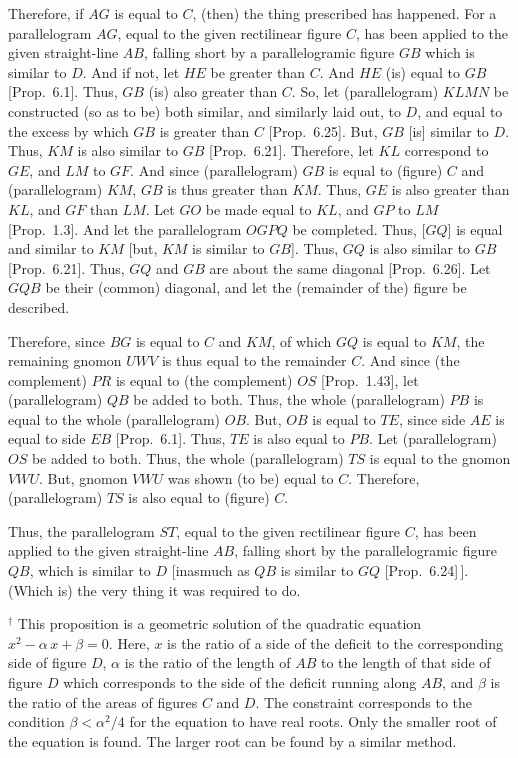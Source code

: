 \begin{Parallel}{}{}
{Therefore, if $AG$ is equal to $C$, (then) the thing prescribed has happened. For
a parallelogram  $AG$, equal to the given rectilinear figure $C$, has been
applied to the given straight-line $AB$, falling short by a parallelogramic
figure $GB$ which is similar to $D$. And if not,  let $HE$ be greater than $C$. 
And $HE$ (is) equal to $GB$ [Prop.~6.1]. 
Thus, $GB$ (is) also greater than $C$.
So, let (parallelogram) $KLMN$ be constructed (so as to be) both similar, and similarly laid out, to $D$,
and equal to the excess by which $GB$ is greater than $C$ [Prop.~6.25]. But, $GB$ [is] similar to
$D$. Thus, $KM$ is also similar to $GB$
[Prop.~6.21]. Therefore, let $KL$ correspond to
$GE$, and $LM$ to $GF$. And since (parallelogram) $GB$ is equal to
(figure) $C$ and (parallelogram) $KM$, $GB$ is thus greater than $KM$. Thus,
$GE$ is also greater than $KL$, and $GF$ than $LM$. Let $GO$ be made equal to
$KL$, and $GP$ to $LM$  [Prop.~1.3]. And let the parallelogram
$OGPQ$ be completed. Thus, [$GQ$] is equal and similar to
$KM$ [but, $KM$ is similar to $GB$]. Thus, $GQ$ is also similar to $GB$ [Prop.~6.21]. Thus, $GQ$ and $GB$ are about the
same diagonal [Prop.~6.26]. 
Let $GQB$ be their (common) diagonal, and let the (remainder of the) figure be described.

Therefore, since $BG$ is equal to $C$ and $KM$, of which $GQ$ is equal
to $KM$, the remaining gnomon $UWV$ is thus equal to the remainder $C$. 
And since (the complement) $PR$ is equal to (the complement) $OS$  [Prop.~1.43], let (parallelogram) $QB$ be added to both. Thus, the whole
(parallelogram) $PB$ is equal to the whole (parallelogram) $OB$. But,
$OB$ is equal to $TE$, since side $AE$ is equal to side $EB$ [Prop.~6.1]. Thus, $TE$ is also equal to $PB$. 
Let (parallelogram) $OS$ be added to both. Thus, the whole (parallelogram) $TS$ is equal to the gnomon $VWU$. But, gnomon $VWU$ was shown (to be)
equal to $C$.  Therefore, (parallelogram) $TS$ is also equal to (figure) $C$.

Thus, the parallelogram $ST$, equal to the given rectilinear figure
$C$, has been applied to the given straight-line $AB$, falling
short by the parallelogramic figure $QB$, which is similar to $D$ [inasmuch as
$QB$ is similar to $GQ$ [Prop.~6.24]\,]. 
(Which is) the very thing it was required to do.}
\end{Parallel}
{\footnotesize\noindent$^\dag$ This proposition is a geometric
solution of the quadratic equation $x^2 - \alpha\,x +\beta = 0$. Here,
$x$ is the ratio of a side of the deficit to the corresponding side of figure $D$, $\alpha$
is the ratio of the length of $AB$ to the length of that side of figure $D$ which corresponds to the side of the deficit running along $AB$, and $\beta$ is the
ratio of the areas of figures $C$ and $D$. The constraint corresponds to the
condition $\beta < \alpha^2/4$ for the equation to have real roots. Only the
smaller root of the equation is found. The larger root can be found by a
similar method.}

